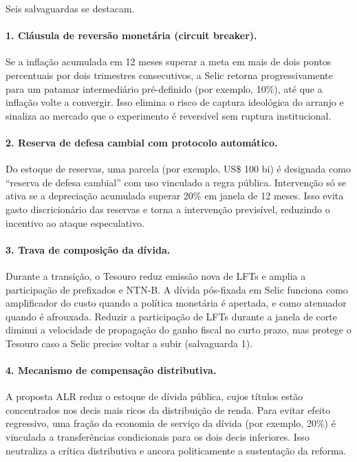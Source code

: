 \documentclass[11pt,a4paper]{article}
\begin{document}
Seis salvaguardas se destacam.

\paragraph{1. Cláusula de reversão monetária (circuit breaker).} Se a
inflação acumulada em 12 meses superar a meta em mais de dois pontos
percentuais por dois trimestres consecutivos, a Selic retorna
progressivamente para um patamar intermediário pré-definido (por exemplo,
10\%), até que a inflação volte a convergir. Isso elimina o risco de
captura ideológica do arranjo e sinaliza ao mercado que o experimento
é reversível sem ruptura institucional.

\paragraph{2. Reserva de defesa cambial com protocolo automático.} Do
estoque de reservas, uma parcela (por exemplo, US\$ 100 bi) é designada
como ``reserva de defesa cambial'' com uso vinculado a regra pública.
Intervenção só se ativa se a depreciação acumulada superar 20\% em janela
de 12 meses. Isso evita gasto discricionário das reservas e torna a
intervenção previsível, reduzindo o incentivo ao ataque especulativo.

\paragraph{3. Trava de composição da dívida.} Durante a transição, o
Tesouro reduz emissão nova de LFTs e amplia a participação de prefixados
e NTN-B. A dívida pós-fixada em Selic funciona como amplificador do custo
quando a política monetária é apertada, e como atenuador quando é
afrouxada. Reduzir a participação de LFTs durante a janela de corte
diminui a velocidade de propagação do ganho fiscal no curto prazo, mas
protege o Tesouro caso a Selic precise voltar a subir (salvaguarda 1).

\paragraph{4. Mecanismo de compensação distributiva.} A proposta ALR
reduz o estoque de dívida pública, cujos títulos estão concentrados nos
decis mais ricos da distribuição de renda. Para evitar efeito regressivo,
uma fração da economia de serviço da dívida (por exemplo, 20\%) é
vinculada a transferências condicionais para os dois decis inferiores.
Isso neutraliza a crítica distributiva e ancora politicamente a
sustentação da reforma.
\end{document}
